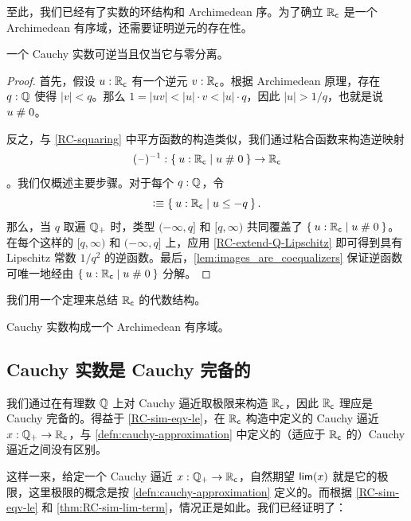 至此，我们已经有了实数的环结构和 Archimedean 序。为了确立 $\mathbb{R}_\mathsf{c}$ 是一个 Archimedean 有序域，还需要证明逆元的存在性。

\begin{thm}
  一个 Cauchy 实数可逆当且仅当它与零分离。
\end{thm}

\begin{proof}
  首先，假设 $u : \mathbb{R}_\mathsf{c}$ 有一个逆元 $v : \mathbb{R}_\mathsf{c}$。根据 Archimedean 原理，存在 $q : \mathbb{Q}$ 使得 $|v| < q$。那么 $1 = |u v| < |u| \cdot v < |u| \cdot q$，因此 $|u| > 1/q$，也就是说 $u \mathrel{\#} 0$。

  反之，与 \cref{RC-squaring} 中平方函数的构造类似，我们通过粘合函数来构造逆映射
  \begin{equation*}
    ({\blank})^{-1} : \setof{ u : \RC | u \apart 0 } \to \RC
  \end{equation*}
  。我们仅概述主要步骤。对于每个 $q : \mathbb{Q}$，令
  \begin{equation*}
    [q, \infty) \defeq \setof{u : \RC | q \leq u}
    \qquad\text{and}\qquad
    (-\infty, q] \defeq \setof{u : \RC | u \leq -q}.
  \end{equation*}
  那么，当 $q$ 取遍 $\mathbb{Q}_{+}$ 时，类型 $(-\infty, q]$ 和 $[q, \infty)$ 共同覆盖了 $\setof{u : \RC | u \apart 0}$。在每个这样的 $[q, \infty)$ 和 $(-\infty, q]$ 上，应用 \cref{RC-extend-Q-Lipschitz} 即可得到具有 Lipschitz 常数 $1/q^2$ 的逆函数。最后，\cref{lem:images_are_coequalizers} 保证逆函数可唯一地经由 $\setof{ u : \RC | u
    \apart 0 }$ 分解。
\end{proof}

我们用一个定理来总结 $\mathbb{R}_\mathsf{c}$ 的代数结构。

\begin{thm} \label{RC-archimedean-ordered-field}
  Cauchy 实数构成一个 Archimedean 有序域。
\end{thm}

\subsection{Cauchy 实数是 Cauchy 完备的}
\label{sec:cauchy-reals-cauchy-complete}

我们通过在有理数 $\mathbb{Q}$ 上对 Cauchy 逼近取极限来构造 $\mathbb{R}_\mathsf{c}$，因此 $\mathbb{R}_\mathsf{c}$ 理应是 Cauchy 完备的。得益于 \cref{RC-sim-eqv-le}，在 $\mathbb{R}_\mathsf{c}$ 构造中定义的 Cauchy 逼近 $x : \mathbb{Q}_{+} \to \mathbb{R}_\mathsf{c}$，与 \cref{defn:cauchy-approximation} 中定义的（适应于 $\mathbb{R}_\mathsf{c}$ 的）Cauchy 逼近之间没有区别。

这样一来，给定一个 Cauchy 逼近 $x : \mathbb{Q}_{+} \to \mathbb{R}_\mathsf{c}$，自然期望 $\mathsf{lim}(x)$ 就是它的极限，这里极限的概念是按 \cref{defn:cauchy-approximation} 定义的。而根据 \cref{RC-sim-eqv-le} 和 \cref{thm:RC-sim-lim-term}，情况正是如此。我们已经证明了：

